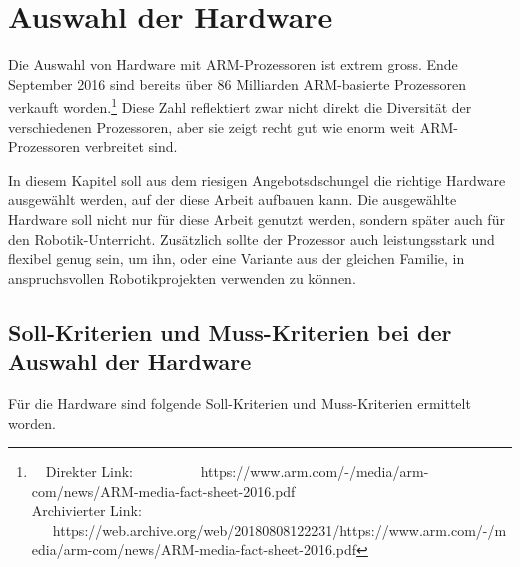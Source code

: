 \chapter{Auswahl der Hardware}
Die Auswahl von Hardware mit ARM-Prozessoren ist extrem gross.
Ende September 2016 sind bereits über 86 Milliarden ARM-basierte Prozessoren verkauft worden.\footnote{\ \ Direkter Link: \ \ \ \ \ \ \ \ \ https://www.arm.com/-/media/arm-com/news/ARM-media-fact-sheet-2016.pdf\\ Archivierter Link: \ \ \ https://web.archive.org/web/20180808122231/https://www.arm.com/-/media/arm-com/news/ARM-media-fact-sheet-2016.pdf}
Diese Zahl reflektiert zwar nicht direkt die Diversität der verschiedenen Prozessoren, aber sie zeigt recht gut wie enorm weit ARM-Prozessoren verbreitet sind.

In diesem Kapitel soll aus dem riesigen Angebotsdschungel die richtige Hardware ausgewählt werden, auf der diese Arbeit aufbauen kann.
Die ausgewählte Hardware soll nicht nur für diese Arbeit genutzt werden, sondern später auch für den Robotik-Unterricht.
Zusätzlich sollte der Prozessor auch leistungsstark und flexibel genug sein, um ihn, oder eine Variante aus der gleichen Familie, in anspruchsvollen Robotikprojekten verwenden zu können.


\section{Soll-Kriterien und Muss-Kriterien bei der Auswahl der Hardware}
Für die Hardware sind folgende Soll-Kriterien und Muss-Kriterien ermittelt worden.


